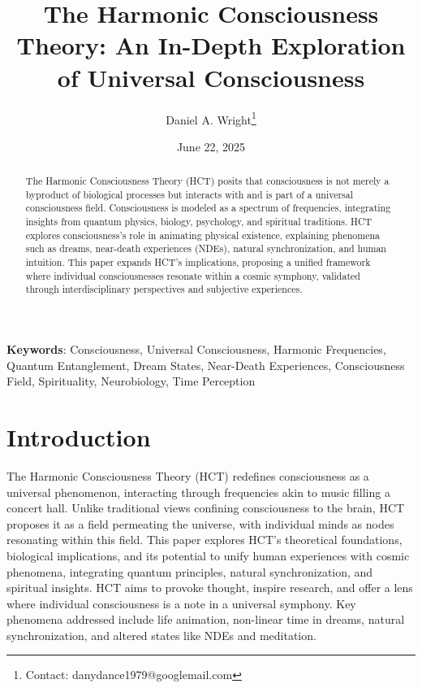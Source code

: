 \documentclass[a4paper,12pt]{article}
\title{The Harmonic Consciousness Theory: An In-Depth Exploration of Universal Consciousness}
\author{Daniel A. Wright\thanks{Contact: danydance1979@googlemail.com}}
\date{June 22, 2025}
\begin{document}
\maketitle

\begin{abstract}
The Harmonic Consciousness Theory (HCT) posits that consciousness is not merely a byproduct of biological processes but interacts with and is part of a universal consciousness field. Consciousness is modeled as a spectrum of frequencies, integrating insights from quantum physics, biology, psychology, and spiritual traditions. HCT explores consciousness's role in animating physical existence, explaining phenomena such as dreams, near-death experiences (NDEs), natural synchronization, and human intuition. This paper expands HCT's implications, proposing a unified framework where individual consciousnesses resonate within a cosmic symphony, validated through interdisciplinary perspectives and subjective experiences.
\end{abstract}

\textbf{Keywords}: Consciousness, Universal Consciousness, Harmonic Frequencies, Quantum Entanglement, Dream States, Near-Death Experiences, Consciousness Field, Spirituality, Neurobiology, Time Perception

\tableofcontents

\section{Introduction}
\label{sec:intro}
The Harmonic Consciousness Theory (HCT) redefines consciousness as a universal phenomenon, interacting through frequencies akin to music filling a concert hall. Unlike traditional views confining consciousness to the brain, HCT proposes it as a field permeating the universe, with individual minds as nodes resonating within this field. This paper explores HCT’s theoretical foundations, biological implications, and its potential to unify human experiences with cosmic phenomena, integrating quantum principles, natural synchronization, and spiritual insights. HCT aims to provoke thought, inspire research, and offer a lens where individual consciousness is a note in a universal symphony. Key phenomena addressed include life animation, non-linear time in dreams, natural synchronization, and altered states like NDEs and meditation.
\end{document}
